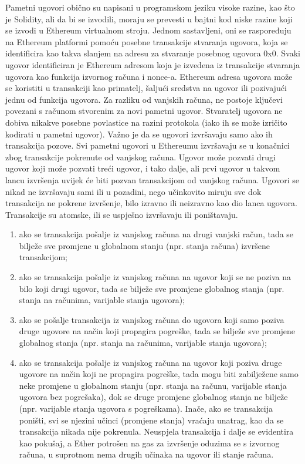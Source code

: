 \documentclass[times, utf8, diplomski]{fer}
\begin{document}
Pametni ugovori obično su napisani u programskom jeziku visoke razine, kao što je Solidity, ali da bi se izvodili, moraju se prevesti u bajtni kod niske razine koji se izvodi u Ethereum virtualnom stroju. Jednom sastavljeni, oni se raspoređuju na Ethereum platformi pomoću posebne transakcije stvaranja ugovora, koja se identificira kao takva slanjem na adresu za stvaranje posebnog ugovora 0x0. Svaki ugovor identificiran je Ethereum adresom koja je izvedena iz transakcije stvaranja ugovora kao funkcija izvornog računa i nonce-a. Ethereum adresa ugovora može se koristiti u transakciji kao primatelj, šaljući sredstva na ugovor ili pozivajući jednu od funkcija ugovora. Za razliku od vanjskih računa, ne postoje ključevi povezani s računom stvorenim za novi pametni ugovor. Stvaratelj ugovora ne dobiva nikakve posebne povlastice na razini protokola (iako ih se može izričito kodirati u pametni ugovor).
Važno je da se ugovori izvršavaju samo ako ih transakcija pozove. Svi pametni ugovori u Ethereumu izvršavaju se u konačnici zbog transakcije pokrenute od vanjskog računa. Ugovor može pozvati drugi ugovor koji može pozvati treći ugovor, i tako dalje, ali prvi ugovor u takvom lancu izvršenja uvijek će biti pozvan transakcijom od vanjskog računa. Ugovori se nikad ne izvršavaju sami ili u pozadini, nego učinkovito miruju sve dok transakcija ne pokrene izvršenje, bilo izravno ili neizravno kao dio lanca ugovora.  Transakcije su atomske,  ili se uspješno izvršavaju ili poništavaju.  \cite{scTemplates}

\begin{enumerate}

\item ako se transakcija pošalje iz vanjskog računa na drugi vanjski račun, tada se bilježe sve promjene u globalnom stanju (npr. stanja računa) izvršene transakcijom;

\item ako se transakcija pošalje iz vanjskog računa na ugovor koji se ne poziva na bilo koji drugi ugovor, tada se bilježe sve promjene globalnog stanja (npr. stanja na računima, varijable stanja ugovora);

\item ako se pošalje transakcija iz vanjskog računa do ugovora koji samo poziva druge ugovore na način koji propagira pogreške, tada se bilježe sve promjene globalnog stanja (npr. stanja na računima, varijable stanja ugovora);

\item ako se transakcija pošalje iz vanjskog računa na ugovor koji poziva druge ugovore na način koji ne propagira pogreške, tada mogu biti zabilježene samo neke promjene u globalnom stanju (npr. stanja na računu, varijable stanja ugovora bez pogrešaka), dok se druge promjene globalnog stanja ne bilježe (npr. varijable stanja ugovora s pogreškama). Inače, ako se transakcija poništi, svi se njezini učinci (promjene stanja) vraćaju unatrag, kao da se transakcija nikada nije pokrenula. Neuspjela transakcija i dalje se evidentira kao pokušaj, a Ether potrošen na gas za izvršenje oduzima se s izvornog računa, u suprotnom nema drugih učinaka na ugovor ili stanje računa.

\end{enumerate}
\end{document}
